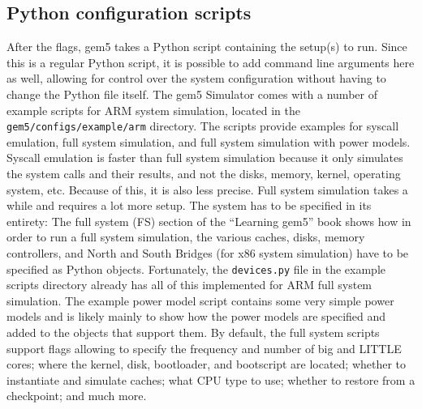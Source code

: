     \subsection{Python configuration scripts}
    After the flags, gem5 takes a Python script containing the setup(s) to run. 
    Since this is a regular Python script, it is possible to add command line 
    arguments here as well, allowing for control over the system configuration 
    without having to change the Python file itself. The gem5 Simulator comes 
    with a number of example scripts for ARM system simulation, located in the 
    \texttt{gem5/configs/example/arm} directory. The scripts provide examples 
    for syscall emulation, full system simulation, and full system simulation 
    with power models. Syscall emulation is faster than full system simulation 
    because it only simulates the system calls and their results, and not the 
    disks, memory, kernel, operating system, etc. Because of this, it is also 
    less precise. Full system simulation takes a while and requires a lot more 
    setup. The system has to be specified in its entirety: The full system (FS) 
    section of the ``Learning gem5'' book \cite{lowe-power_full_nodate} shows 
    how in order to run a full system simulation, the various caches, disks, 
    memory controllers, and North and South Bridges (for x86 system simulation) 
    have to be specified as Python objects. Fortunately, the 
    \texttt{devices.py} file in the example scripts directory already has all 
    of this implemented for ARM full system simulation. The example power model 
    script contains some very simple power models and is likely mainly to show 
    how the power models are specified and added to the objects that support 
    them. By default, the full system scripts support flags allowing to specify 
    the frequency and number of big and LITTLE cores; where the kernel, disk, 
    bootloader, and bootscript are located; whether to instantiate and simulate 
    caches; what CPU type to use; whether to restore from a checkpoint; and 
    much more.
    
